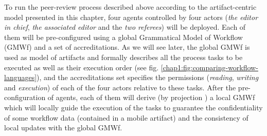 \label{chap3:sec:peer-review-overview}
To run the peer-review process described above according to the artifact-centric model presented in this chapter, four agents controlled by four actors (\textit{the editor in chief}, \textit{the associated editor} and the \textit{two referees}) will be deployed. 
Each of them will be pre-configured using a global Grammatical Model of Workflow (GMWf) and a set of accreditations. As we will see later, the global GMWf is used as model of artifacts and formally describes all the process tasks to be executed as well as their execution order (see fig. \ref{chap1:fig:comparing-workflow-languages}), and the accreditations set specifies the permissions (\textit{reading}, \textit{writing} and \textit{execution}) of each of the four actors relative to these tasks. 
After the pre-configuration of agents, each of them will derive (by projection \cite{tchoupeAtemkeng2}) a local GMWf which will locally guide the execution of the tasks to guarantee the confidentiality of some workflow data (contained in a mobile artifact) and the consistency of local updates with the global GMWf.

